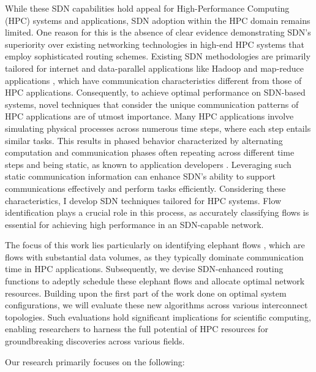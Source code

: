 While these SDN capabilities hold appeal for High-Performance Computing (HPC)
systems and applications, SDN adoption within the HPC domain remains limited.
One reason for this is the absence of clear evidence demonstrating SDN's
superiority over existing networking technologies in high-end HPC systems that
employ sophisticated routing schemes. Existing SDN methodologies are primarily
tailored for internet and data-parallel applications like Hadoop and map-reduce
applications \cite{he2016firebird}, which have communication characteristics different from those
of HPC applications. Consequently, to achieve optimal performance on SDN-based
systems, novel techniques that consider the unique communication patterns of HPC
applications are of utmost importance. Many HPC applications involve simulating physical
processes across numerous time steps, where each step entails similar tasks.
This results in phased behavior characterized by alternating computation and
communication phases often
repeating across different time steps and being static, as known to application
developers \cite{faraj2002communication} \cite{hong2013achieving}. Leveraging such static communication information can enhance
SDN's ability to support communications effectively and perform tasks
efficiently. Considering these characteristics, I develop SDN techniques
tailored for HPC systems. Flow identification plays a crucial role in this
process, as accurately classifying flows is essential for achieving high
performance in an SDN-capable network. 

The focus of this work lies particularly on
identifying elephant flows \cite{he2016firebird}, which are flows with substantial data volumes,
as they typically dominate communication time in HPC applications. Subsequently,
we devise SDN-enhanced routing functions to adeptly schedule these elephant
flows and allocate optimal network resources. Building upon the first part of the work done 
on optimal system configurations, we will evaluate these new algorithms across
various interconnect topologies.  Such evaluations hold significant implications
for scientific computing, enabling researchers to harness the full potential of
HPC resources for groundbreaking discoveries across various fields.



Our research primarily focuses on the following:

